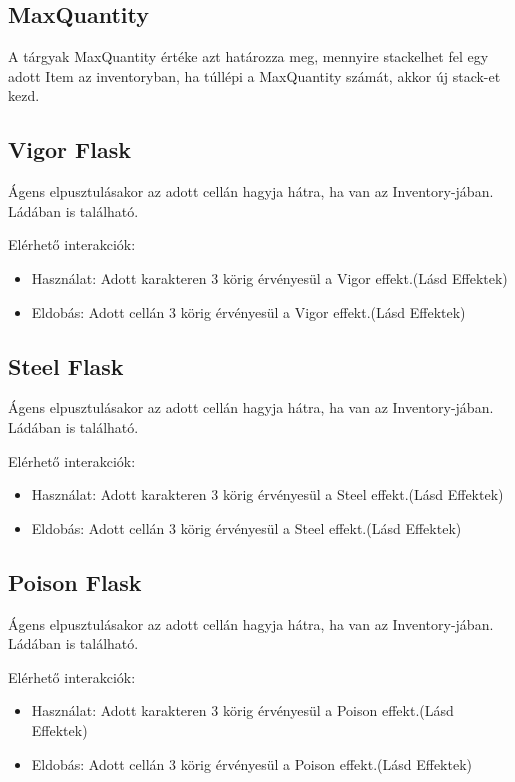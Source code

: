 \subsection{MaxQuantity}

A tárgyak MaxQuantity értéke azt határozza meg, mennyire stackelhet fel egy adott Item az inventoryban, ha túllépi a MaxQuantity számát, akkor új stack-et kezd.


\subsection{Vigor Flask}

Ágens elpusztulásakor az adott cellán hagyja hátra, ha van az Inventory-jában. Ládában is található.

\noindent Elérhető interakciók:
\begin{itemize}
    \item Használat: Adott karakteren 3 körig érvényesül a Vigor effekt.(Lásd Effektek)
    \item Eldobás: Adott cellán 3 körig érvényesül a Vigor effekt.(Lásd Effektek)
\end{itemize}

\subsection{Steel Flask}

Ágens elpusztulásakor az adott cellán hagyja hátra, ha van az Inventory-jában. Ládában is található.

\noindent Elérhető interakciók:
\begin{itemize}
    \item Használat: Adott karakteren 3 körig érvényesül a Steel effekt.(Lásd Effektek)
    \item Eldobás: Adott cellán 3 körig érvényesül a Steel effekt.(Lásd Effektek)
\end{itemize}

\subsection{Poison Flask}

Ágens elpusztulásakor az adott cellán hagyja hátra, ha van az Inventory-jában. Ládában is található.

\noindent Elérhető interakciók:
\begin{itemize}
    \item Használat: Adott karakteren 3 körig érvényesül a Poison effekt.(Lásd Effektek)
    \item Eldobás: Adott cellán 3 körig érvényesül a Poison effekt.(Lásd Effektek)
\end{itemize}

